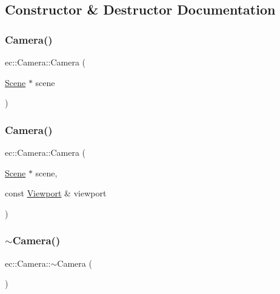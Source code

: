 \subsection{Constructor \& Destructor Documentation}
\mbox{\label{classec_1_1_camera_a5b8034c32e082171bdb61033781cdcc3}} 
\subsubsection{\texorpdfstring{Camera()}{Camera()}\hspace{0.1cm}{\footnotesize\ttfamily [1/2]}}
{\footnotesize\ttfamily ec\+::\+Camera\+::\+Camera (\begin{DoxyParamCaption}\item[{\mbox{\hyperlink{classec_1_1_scene}{Scene}} $\ast$}]{scene }\end{DoxyParamCaption})\hspace{0.3cm}{\ttfamily [explicit]}}

\mbox{\label{classec_1_1_camera_ab5fa55c91ae586754b613c3e8f33b31c}} 
\subsubsection{\texorpdfstring{Camera()}{Camera()}\hspace{0.1cm}{\footnotesize\ttfamily [2/2]}}
{\footnotesize\ttfamily ec\+::\+Camera\+::\+Camera (\begin{DoxyParamCaption}\item[{\mbox{\hyperlink{classec_1_1_scene}{Scene}} $\ast$}]{scene,  }\item[{const \mbox{\hyperlink{classec_1_1_viewport}{Viewport}} \&}]{viewport }\end{DoxyParamCaption})\hspace{0.3cm}{\ttfamily [explicit]}}

\mbox{\label{classec_1_1_camera_a11d706554e37d6dde0b9313a445cbd4b}} 
\subsubsection{\texorpdfstring{$\sim$\+Camera()}{~Camera()}}
{\footnotesize\ttfamily ec\+::\+Camera\+::$\sim$\+Camera (\begin{DoxyParamCaption}{ }\end{DoxyParamCaption})\hspace{0.3cm}{\ttfamily [default]}}



